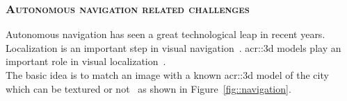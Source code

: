         \subsubsection{\textsc{Autonomous navigation related challenges}}
            Autonomous navigation has seen a great technological leap in recent years.
            Localization is an important step in visual navigation~\parencite{bonin2008visual}.
            \Gls{acr::3d} models play an important role in visual localization~\parencite{piasco2018survey, ijgi4042842}.\\
            The basic idea is to match an image with a known \gls{acr::3d} model of the city which can be textured or not~\parencite{arth2015instant, ardeshir2014gis, cham2010estimating, christie2016semantics} as shown in Figure~\ref{fig::navigation}.
            \begin{figure}[htpb]
                \centering
\end{figure}
